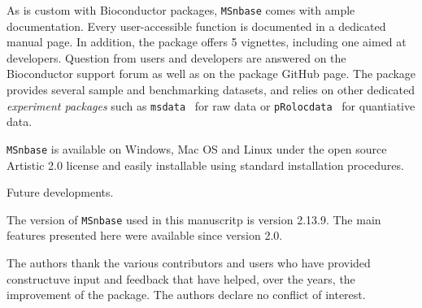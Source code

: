 \documentclass[journal=jacsat,manuscript=article]{achemso}\usepackage[]{graphicx}\usepackage[]{color}
\begin{document}
As is custom with Bioconductor packages, \texttt{MSnbase} comes with
ample documentation. Every user-accessible function is documented in a
dedicated manual page. In addition, the package offers 5 vignettes,
including one aimed at developers. Question from users and developers
are answered on the Bioconductor support forum as well as on the
package GitHub page. The package provides several sample and
benchmarking datasets, and relies on other dedicated
\textit{experiment packages} such as \texttt{msdata}~\cite{msdata} for
raw data or \texttt{pRolocdata}~\cite{Gatto:2014a} for quantiative
data.

\texttt{MSnbase} is available on Windows, Mac OS and Linux under the
open source Artistic 2.0 license and easily installable using standard
installation procedures.


Future developments.



The version of \texttt{MSnbase} used in this manuscritp is version
2.13.9. The main features presented here were available since
version 2.0.



\begin{acknowledgement}

The authors thank the various contributors and users who have provided
constructuve input and feedback that have helped, over the years, the
improvement of the package. The authors declare no conflict of
interest.

\end{acknowledgement}




\end{document}
